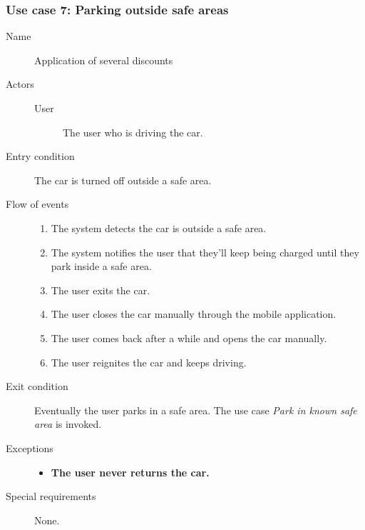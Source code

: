 	\subsubsection{Use case 7: Parking outside safe areas}
		\begin{description}
			\item[Name] Application of several discounts
			\item[Actors] \hfill
				\begin{description}
					\item[User] The user who is driving the car.
				\end{description}
			\item[Entry condition] The car is turned off outside a safe area.
			\item[Flow of events]
				\begin{enumerate}
					\item The system detects the car is outside a safe area.
					\item The system notifies the user that they'll keep being charged until they park inside a safe area.
					\item The user exits the car.
					\item The user closes the car manually through the mobile application.
					\item The user comes back after a while and opens the car manually.
					\item The user reignites the car and keeps driving.
				\end{enumerate}
			\item[Exit condition] Eventually the user parks in a safe area. The use case \textit{Park in known safe area} is invoked.
			\item[Exceptions]
				\begin{itemize}
					\item \textbf{The user never returns the car.} %
				\end{itemize}
			\item[Special requirements] None. %
		\end{description}		

